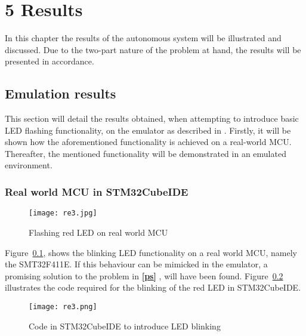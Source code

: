 

\chapter*{5 Results}
\label{results}
\setcounter{chapter}{5}
\setcounter{section}{0}
\setcounter{figure}{0}
\setcounter{table}{0}

In this chapter the results of the autonomous system will be illustrated and discussed. Due to the two-part nature of the problem at hand, the results will be presented in accordance. 

\section{Emulation results} 
\label{emuRes}
This section will detail the results obtained, when attempting to introduce basic LED flashing functionality, on the emulator as described in \textbf{}. Firstly, it will be shown how the aforementioned functionality is achieved on a real-world MCU. Thereafter, the mentioned functionality will be demonstrated in an emulated environment.
\subsection{Real world MCU in STM32CubeIDE}
\label{real}

\begin{figure}[H]
\begin{center}
\texttt{[image: re3.jpg]}
\caption{Flashing red LED on real world MCU}
\label{re3.1}
\end{center}
\end{figure}

Figure~\ref{re3.1}, shows the blinking LED functionality on a real world MCU, namely the SMT32F411E. If this behaviour can be mimicked in the emulator, a promising solution to the problem in \textbf{\ref{ps} }, will have been found. Figure~\ref{re3.2} illustrates the code required for the blinking of the red LED in STM32CubeIDE.

\begin{figure}[H]
\begin{center}
\texttt{[image: re3.png]}
\caption{Code in STM32CubeIDE to introduce LED blinking}
\label{re3.2}
\end{center}
\end{figure}




